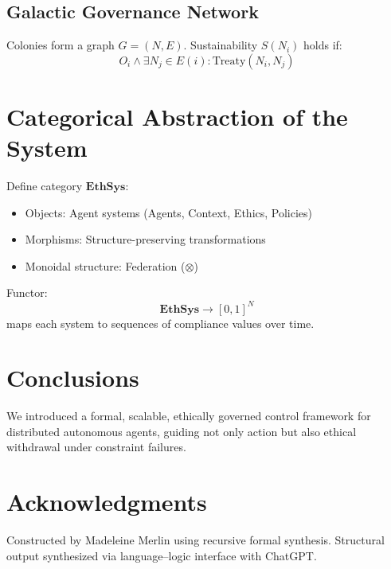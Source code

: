 \documentclass[11pt]{article}
\begin{document}
\subsection{Galactic Governance Network}
Colonies form a graph $G = (N, E)$. Sustainability $S(N_i)$ holds if:
\[
O_i \land \exists N_j \in E(i): \text{Treaty}(N_i, N_j)
\]

\section{Categorical Abstraction of the System}
Define category $\mathbf{EthSys}$:
\begin{itemize}
  \item Objects: Agent systems (Agents, Context, Ethics, Policies)
  \item Morphisms: Structure-preserving transformations
  \item Monoidal structure: Federation ($\otimes$)
\end{itemize}

Functor:
\[
\mathbf{EthSys} \to [0,1]^N
\]
maps each system to sequences of compliance values over time.

\section{Conclusions}
We introduced a formal, scalable, ethically governed control framework for distributed autonomous agents, guiding not only action but also ethical withdrawal under constraint failures.

\section*{Acknowledgments}
Constructed by Madeleine Merlin using recursive formal synthesis. Structural output synthesized via language–logic interface with ChatGPT.
\end{document}
